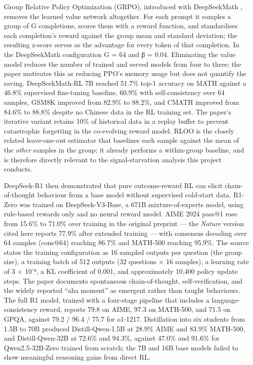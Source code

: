 \documentclass[12pt,a4paper]{report}
\begin{document}
Group Relative Policy Optimization (GRPO), introduced with DeepSeekMath
\citep{shao2024deepseekmath}, removes the learned value network
altogether. For each prompt it samples a group of G completions, scores
them with a reward function, and standardises each completion's reward
against the group mean and standard deviation; the resulting z-score
serves as the advantage for every token of that completion. In the
DeepSeekMath configuration G = 64 and β = 0.04. Eliminating the value
model reduces the number of trained and served models from four to
three; the paper motivates this as reducing PPO's memory usage but does
not quantify the saving. DeepSeekMath-RL 7B reached 51.7\% top-1
accuracy on MATH against a 46.8\% supervised fine-tuning baseline,
60.9\% with self-consistency over 64 samples, GSM8K improved from 82.9\%
to 88.2\%, and CMATH improved from 84.6\% to 88.8\% despite no Chinese
data in the RL training set. The paper's iterative variant retains 10\%
of historical data in a replay buffer to prevent catastrophic forgetting
in the co-evolving reward model. RLOO \citep{ahmadian2024backtobasics}
is the closely related leave-one-out estimator that baselines each
sample against the mean of the \emph{other} samples in the group; it
already performs a within-group baseline, and is therefore directly
relevant to the signal-starvation analysis this project conducts.

DeepSeek-R1 \citep{guo2025deepseekr1} then demonstrated that pure
outcome-reward RL can elicit chain-of-thought behaviour from a base
model without supervised cold-start data. R1-Zero was trained on
DeepSeek-V3-Base, a 671B mixture-of-experts model, using rule-based
rewards only and no neural reward model. AIME 2024 pass@1 rose from
15.6\% to 71.0\% over training in the original preprint --- the
\emph{Nature} version cited here reports 77.9\% after extended training
--- with consensus decoding over 64 samples (cons@64) reaching 86.7\%
and MATH-500 reaching 95.9\%. The source states the training
configuration as 16 sampled outputs per question (the group size), a
training batch of 512 outputs (32 questions × 16 samples), a learning
rate of 3 × 10⁻⁶, a KL coefficient of 0.001, and approximately 10,400
policy update steps. The paper documents spontaneous chain-of-thought,
self-verification, and the widely reported ``aha moment'' as emergent
rather than taught behaviours. The full R1 model, trained with a
four-stage pipeline that includes a language-consistency reward, reports
79.8 on AIME, 97.3 on MATH-500, and 71.5 on GPQA, against 79.2 / 96.4 /
75.7 for o1-1217. Distillation into six students from 1.5B to 70B
produced Distill-Qwen-1.5B at 28.9\% AIME and 83.9\% MATH-500, and
Distill-Qwen-32B at 72.6\% and 94.3\%, against 47.0\% and 91.6\% for
Qwen2.5-32B-Zero trained from scratch; the 7B and 16B base models failed
to show meaningful reasoning gains from direct RL.
\end{document}
